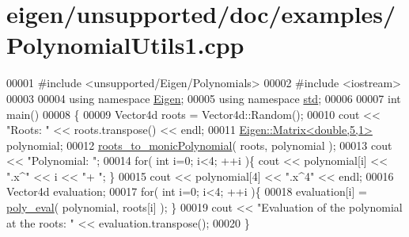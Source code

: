 \hypertarget{eigen_2unsupported_2doc_2examples_2_polynomial_utils1_8cpp_source}{}\section{eigen/unsupported/doc/examples/\+Polynomial\+Utils1.cpp}
\label{eigen_2unsupported_2doc_2examples_2_polynomial_utils1_8cpp_source}

\begin{DoxyCode}
00001 \textcolor{preprocessor}{#include <unsupported/Eigen/Polynomials>}
00002 \textcolor{preprocessor}{#include <iostream>}
00003 
00004 \textcolor{keyword}{using namespace }\hyperlink{namespace_eigen}{Eigen};
00005 \textcolor{keyword}{using namespace }\hyperlink{namespacestd}{std};
00006 
00007 \textcolor{keywordtype}{int} main()
00008 \{
00009   Vector4d roots = Vector4d::Random();
00010   cout << \textcolor{stringliteral}{"Roots: "} << roots.transpose() << endl;
00011   \hyperlink{group___core___module_class_eigen_1_1_matrix}{Eigen::Matrix<double,5,1>} polynomial;
00012   \hyperlink{namespace_eigen_afbc3648f7ef67db3d5d04454fc1257fd}{roots\_to\_monicPolynomial}( roots, polynomial );
00013   cout << \textcolor{stringliteral}{"Polynomial: "};
00014   \textcolor{keywordflow}{for}( \textcolor{keywordtype}{int} i=0; i<4; ++i )\{ cout << polynomial[i] << \textcolor{stringliteral}{".x^"} << i << \textcolor{stringliteral}{"+ "}; \}
00015   cout << polynomial[4] << \textcolor{stringliteral}{".x^4"} << endl;
00016   Vector4d evaluation;
00017   \textcolor{keywordflow}{for}( \textcolor{keywordtype}{int} i=0; i<4; ++i )\{
00018     evaluation[i] = \hyperlink{namespace_eigen_adb64ffddaa9e83634e3ab0e3fd3664f5}{poly\_eval}( polynomial, roots[i] ); \}
00019   cout << \textcolor{stringliteral}{"Evaluation of the polynomial at the roots: "} << evaluation.transpose();
00020 \}
\end{DoxyCode}

